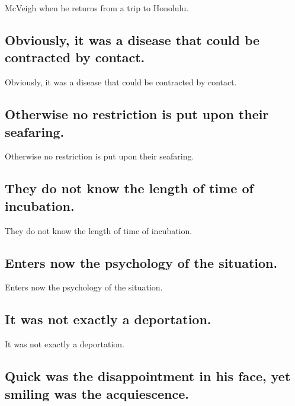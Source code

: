 \documentclass[]{article}
\begin{document}
McVeigh when he returns from a trip to Honolulu.

\hypertarget{obviously-it-was-a-disease-that-could-be-contracted-by-contact.}{%
\subsection{Obviously, it was a disease that could be contracted by
contact.}\label{obviously-it-was-a-disease-that-could-be-contracted-by-contact.}}

Obviously, it was a disease that could be contracted by contact.

\hypertarget{otherwise-no-restriction-is-put-upon-their-seafaring.}{%
\subsection{Otherwise no restriction is put upon their
seafaring.}\label{otherwise-no-restriction-is-put-upon-their-seafaring.}}

Otherwise no restriction is put upon their seafaring.

\hypertarget{they-do-not-know-the-length-of-time-of-incubation.}{%
\subsection{They do not know the length of time of
incubation.}\label{they-do-not-know-the-length-of-time-of-incubation.}}

They do not know the length of time of incubation.

\hypertarget{enters-now-the-psychology-of-the-situation.}{%
\subsection{Enters now the psychology of the
situation.}\label{enters-now-the-psychology-of-the-situation.}}

Enters now the psychology of the situation.

\hypertarget{it-was-not-exactly-a-deportation.}{%
\subsection{It was not exactly a
deportation.}\label{it-was-not-exactly-a-deportation.}}

It was not exactly a deportation.

\hypertarget{quick-was-the-disappointment-in-his-face-yet-smiling-was-the-acquiescence.}{%
\subsection{Quick was the disappointment in his face, yet smiling was
the
acquiescence.}\label{quick-was-the-disappointment-in-his-face-yet-smiling-was-the-acquiescence.}}
\end{document}
